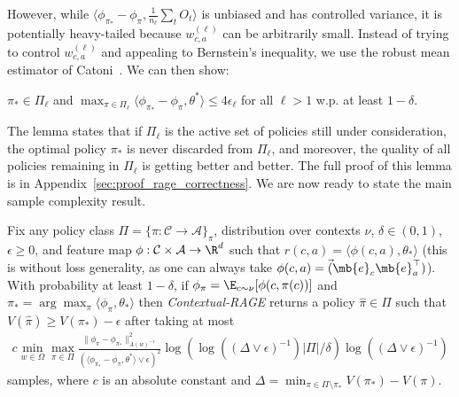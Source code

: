 \documentclass{article}
\newcommand{\mc}[1]{\mathcal{#1}}
\newcommand{\1}{\mathbf{1}}
\begin{document}
However, while $\langle \phi_{\pi_*} - \phi_{\pi}, \frac{1}{n_{\ell}} \sum_t O_t \rangle$ is unbiased and has controlled variance, it is potentially heavy-tailed because $w^{(\ell)}_{c,a}$ can be arbitrarily small.
Instead of trying to control $w^{(\ell)}_{c,a}$ and appealing to Bernstein's inequality, we use the robust mean estimator of Catoni~\cite{lugosi2019mean}. We can then show:
\begin{lemma}\label{lem:rage_correctness}
$\pi_* \in \Pi_\ell$ and $\max_{\pi \in \Pi_\ell} \langle \phi_{\pi_*} - \phi_\pi, \theta^* \rangle \leq 4 \epsilon_\ell$ for all $\ell > 1$ w.p. at least $1-\delta$.
\end{lemma}
The lemma states that if $\Pi_\ell$ is the active set of policies still under consideration, the optimal policy $\pi_*$ is never discarded from $\Pi_\ell$, and moreover, the quality of all policies remaining in $\Pi_\ell$ is getting better and better. The full proof of this lemma is in Appendix~\ref{sec:proof_rage_correctness}. 
We are now ready to state the main sample complexity result. 

\begin{theorem}\label{thm:contextual_rage}
Fix any policy class $\Pi = \{ \pi : \mc{C} \rightarrow \mc{A} \}_\pi$, distribution over contexts $\nu$, $\delta \in (0,1)$, $\epsilon \geq 0$, and feature map $\phi: \mc{C} \times \mc{A} \rightarrow \R^d$ such that $r(c,a) = \langle \phi(c,a) , \theta_* \rangle$ (this is without loss generality, as one can always take $\phi(c,a) = \vec(\mb{e}_c \mb{e}_a^\top)$). 
With probability at least $1-\delta$, if $\phi_\pi = \E_{c \sim \nu}[\phi(c,\pi(c))]$ and $\pi_* = \arg\max_{\pi} \langle \phi_{\pi}, \theta_* \rangle$ then \emph{Contextual-RAGE} returns a policy $\widehat{\pi} \in \Pi$ such that $V(\widehat{\pi}) \geq V(\pi_*) - \epsilon$  after taking at most
\begin{align*}
    c  \min_{w \in\Omega}\max_{\pi \in \Pi} \frac{\|\phi_\pi-\phi_{\pi_*}\|_{A(w)^{-1}}^2}{(\langle \phi_{\pi_*}-\phi_\pi , \theta^* \rangle \vee \epsilon)^2}  \log( \log((\Delta \vee \epsilon)^{-1}) |\Pi| /\delta)\log((\Delta \vee \epsilon)^{-1})
\end{align*}
samples, where $c$ is an absolute constant and $\Delta = \min_{\pi \in \Pi \setminus \pi_*} V(\pi_*) - V(\pi)$.
\end{theorem}
\end{document}
